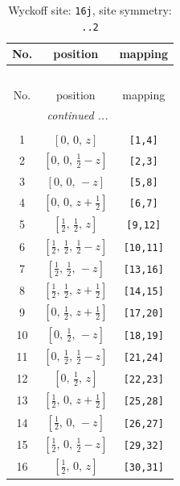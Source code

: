 \documentclass[fleqn,8pt]{jsarticle}
\begin{document}
\begin{longtable}{ccc}
\caption{Wyckoff site: {\tt 16j}, site symmetry: {\tt ..2}}
 \\
 \hline \hline
No. & position & mapping \\ \hline \endfirsthead

\multicolumn{2}{l}{\tablename\ \thetable{}} \\
 \hline \hline
No. & position & mapping \\ \hline \endhead

 \hline \hline
\multicolumn{2}{r}{\footnotesize\it continued ...} \\ \endfoot

 \hline \hline
\multicolumn{2}{r}{} \\ \endlastfoot

1 & $\left[ 0,\, 0,\, z \right]$ & {\tt [1,4]} \\ \hline
2 & $\left[ 0,\, 0,\, \frac{1}{2} - z \right]$ & {\tt [2,3]} \\ \hline
3 & $\left[ 0,\, 0,\, - z \right]$ & {\tt [5,8]} \\ \hline
4 & $\left[ 0,\, 0,\, z + \frac{1}{2} \right]$ & {\tt [6,7]} \\ \hline
5 & $\left[ \frac{1}{2},\, \frac{1}{2},\, z \right]$ & {\tt [9,12]} \\ \hline
6 & $\left[ \frac{1}{2},\, \frac{1}{2},\, \frac{1}{2} - z \right]$ & {\tt [10,11]} \\ \hline
7 & $\left[ \frac{1}{2},\, \frac{1}{2},\, - z \right]$ & {\tt [13,16]} \\ \hline
8 & $\left[ \frac{1}{2},\, \frac{1}{2},\, z + \frac{1}{2} \right]$ & {\tt [14,15]} \\ \hline
9 & $\left[ 0,\, \frac{1}{2},\, z + \frac{1}{2} \right]$ & {\tt [17,20]} \\ \hline
10 & $\left[ 0,\, \frac{1}{2},\, - z \right]$ & {\tt [18,19]} \\ \hline
11 & $\left[ 0,\, \frac{1}{2},\, \frac{1}{2} - z \right]$ & {\tt [21,24]} \\ \hline
12 & $\left[ 0,\, \frac{1}{2},\, z \right]$ & {\tt [22,23]} \\ \hline
13 & $\left[ \frac{1}{2},\, 0,\, z + \frac{1}{2} \right]$ & {\tt [25,28]} \\ \hline
14 & $\left[ \frac{1}{2},\, 0,\, - z \right]$ & {\tt [26,27]} \\ \hline
15 & $\left[ \frac{1}{2},\, 0,\, \frac{1}{2} - z \right]$ & {\tt [29,32]} \\ \hline
16 & $\left[ \frac{1}{2},\, 0,\, z \right]$ & {\tt [30,31]} \\
\end{longtable}
\end{document}
